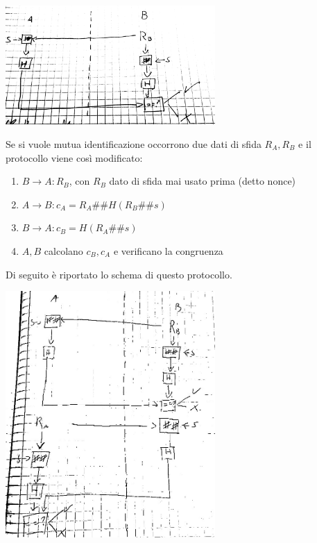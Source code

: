 \documentclass[answers, a4paper, 11pt]{exam}
\newcommand{\concat}{\#\#}
\begin{document}
\begin{questions}
\begin{parts}
\begin{solution}
\includegraphics[width=0.6\textwidth]{crhash}

	Se si vuole mutua identificazione occorrono due dati di sfida $R_A, R_B$ e il protocollo viene così modificato:
	  \begin{enumerate}
    \item $B \rightarrow A: R_B$, con $R_B$ dato di sfida mai usato prima (detto nonce)
    \item $A \rightarrow B: c_A = R_A \concat H(R_B \concat s)$
		\item $B \rightarrow A: c_B = H(R_A \concat s)$
		\item $A, B$ calcolano $c_B, c_A$ e verificano la congruenza
  \end{enumerate}
	Di seguito è riportato lo schema di questo protocollo.

\includegraphics[width=0.6\textwidth]{crhashmut}


\end{solution}
\end{parts}
\end{questions}
\end{document}
